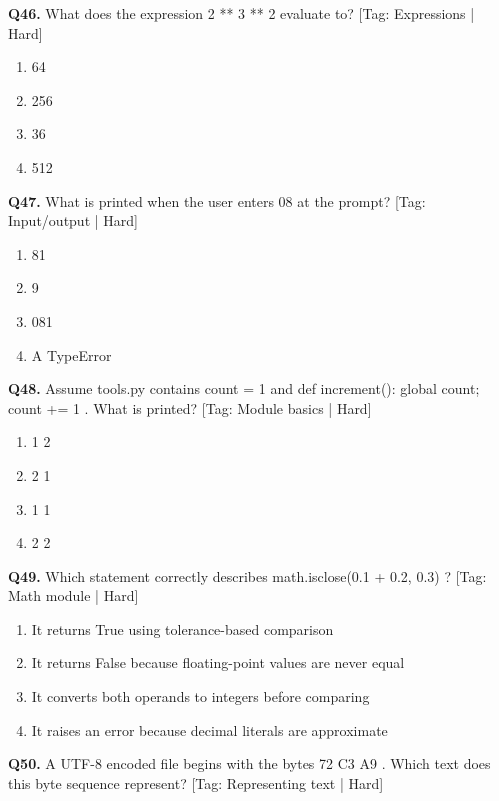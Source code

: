 \vspace{2mm}
\noindent\textbf{Q46.} What does the expression 2 ** 3 ** 2 evaluate to? \hfill [Tag: Expressions | Hard]
\begin{enumerate}[label=(\alph*),topsep=2pt,itemsep=1pt,partopsep=0pt,parsep=0pt]
    \item {64}
    \item {256}
    \item {36}
    \item {512}
\end{enumerate}
\vspace{2mm}
\noindent\textbf{Q47.} What is printed when the user enters 08 at the prompt? \hfill [Tag: Input/output | Hard]
\begin{enumerate}[label=(\alph*),topsep=2pt,itemsep=1pt,partopsep=0pt,parsep=0pt]
    \item {81}
    \item {9}
    \item {081}
    \item {A TypeError}
\end{enumerate}
\vspace{2mm}
\noindent\textbf{Q48.} Assume tools.py contains count = 1 and def increment(): global count; count += 1 . What is printed? \hfill [Tag: Module basics | Hard]
\begin{enumerate}[label=(\alph*),topsep=2pt,itemsep=1pt,partopsep=0pt,parsep=0pt]
    \item {1 2}
    \item {2 1}
    \item {1 1}
    \item {2 2}
\end{enumerate}
\vspace{2mm}
\noindent\textbf{Q49.} Which statement correctly describes math.isclose(0.1 + 0.2, 0.3) ? \hfill [Tag: Math module | Hard]
\begin{enumerate}[label=(\alph*),topsep=2pt,itemsep=1pt,partopsep=0pt,parsep=0pt]
    \item {It returns True using tolerance-based comparison}
    \item {It returns False because floating-point values are never equal}
    \item {It converts both operands to integers before comparing}
    \item {It raises an error because decimal literals are approximate}
\end{enumerate}
\vspace{2mm}
\noindent\textbf{Q50.} A UTF-8 encoded file begins with the bytes 72 C3 A9 . Which text does this byte sequence represent? \hfill [Tag: Representing text | Hard]
